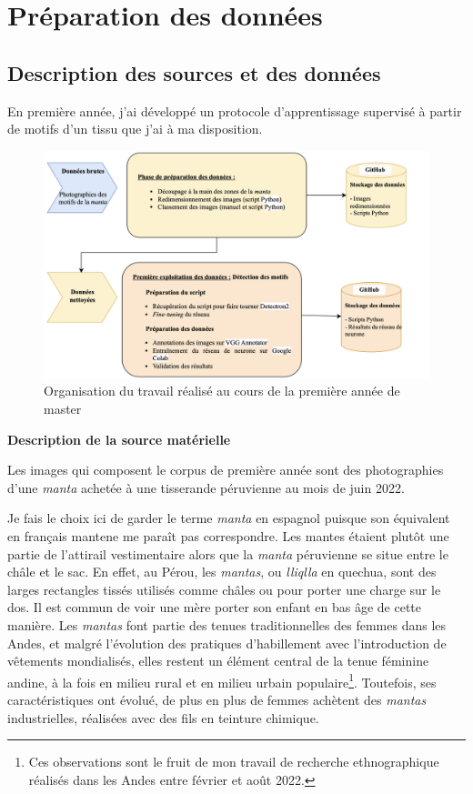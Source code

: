 \documentclass[a4paper, twoside, 12pt]{book}
\begin{document}
\chapter{Préparation des données}
\section{Description des sources et des données}

En première année, j'ai développé un protocole d'apprentissage supervisé à partir de motifs d'un tissu que j'ai à ma disposition. \\

\begin{figure}[!h]
    \centering
    \includegraphics[width=15cm]{images/pipeline.png}
    \caption{Organisation du travail réalisé au cours de la première année de master}
    \label{pipeline}
\end{figure}

\textbf{Description de la source matérielle}

Les images qui composent le corpus de première année sont des photographies d'une \textit{manta} achetée à une tisserande péruvienne au mois de juin 2022. 

Je fais le choix ici de garder le terme \textit{manta} en espagnol puisque son équivalent en français \og mante\fg \:ne me paraît pas correspondre. Les mantes étaient plutôt une partie de l'attirail vestimentaire alors que la \textit{manta} péruvienne se situe entre le châle et le sac. En effet, au Pérou, les \textit{mantas}, ou \textit{lliqlla} en quechua, sont des larges rectangles tissés utilisés comme châles ou pour porter une charge sur le dos. Il est commun de voir une mère porter son enfant en bas âge de cette manière. Les \textit{mantas} font partie des tenues traditionnelles des femmes dans les Andes, et malgré l'évolution des pratiques d'habillement avec l'introduction de vêtements \og mondialisés\fg, elles restent un élément central de la tenue féminine andine, à la fois en milieu rural et en milieu urbain populaire\footnote{Ces observations sont le fruit de mon travail de recherche ethnographique réalisés dans les Andes entre février et août 2022.}. Toutefois, ses caractéristiques ont évolué, de plus en plus de femmes achètent des \textit{mantas} industrielles, réalisées avec des fils en teinture chimique.
\end{document}
